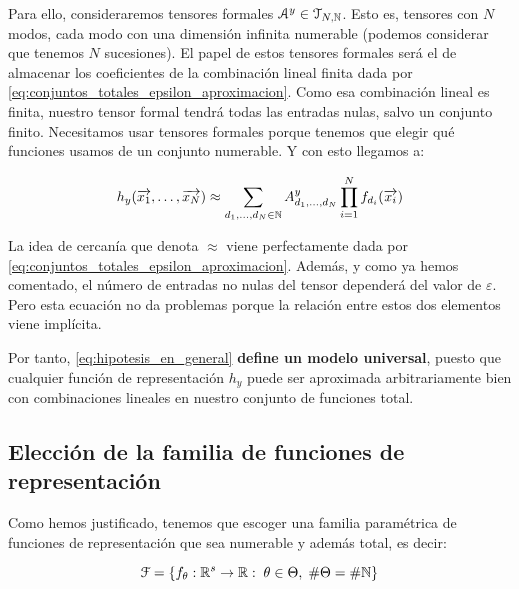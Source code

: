 Para ello, consideraremos tensores formales $\mathcal{A}^y \in \mathcal{T}_{N, \mathbb{N}}$. Esto es, tensores con $N$ modos, cada modo con una dimensión infinita numerable (podemos considerar que tenemos $N$ sucesiones). El papel de estos tensores formales será el de almacenar los coeficientes de la combinación lineal finita dada por \eqref{eq:conjuntos_totales_epsilon_aproximacion}. Como esa combinación lineal es finita, nuestro tensor formal tendrá todas las entradas nulas, salvo un conjunto finito. Necesitamos usar tensores formales porque tenemos que elegir qué funciones usamos de un conjunto numerable. Y con esto llegamos a:

\begin{equation} \label{eq:hipotesis_en_general}
	h_y(\overrightarrow{x_1}, \ldots, \overrightarrow{x_N}) \approx \sum_{d_1, \ldots, d_N \in \mathbb{N}} A^y_{d_1, \ldots, d_N} \prod_{i = 1}^N f_{d_i}(\overrightarrow{x_i})
\end{equation}

\begin{observacion}

	La idea de cercanía que denota $\approx$ viene perfectamente dada por \eqref{eq:conjuntos_totales_epsilon_aproximacion}. Además, y como ya hemos comentado, el número de entradas no nulas del tensor dependerá del valor de $\varepsilon$. Pero esta ecuación no da problemas porque la relación entre estos dos elementos viene implícita.

\end{observacion}

Por tanto, \eqref{eq:hipotesis_en_general} \textbf{define un modelo universal}, puesto que cualquier función de representación $h_y$ puede ser aproximada arbitrariamente bien con combinaciones lineales en nuestro conjunto de funciones total.

\subsection{Elección de la familia de funciones de representación}


Como hemos justificado, tenemos que escoger una familia paramétrica de funciones de representación que sea numerable y además total, es decir:

\begin{equation}
	\mathcal{F} = \{  f_{\theta}: \mathbb{R}^s \to \mathbb{R}: \; \theta \in \Theta, \; \# \Theta = \# \mathbb{N}  \}
\end{equation}

